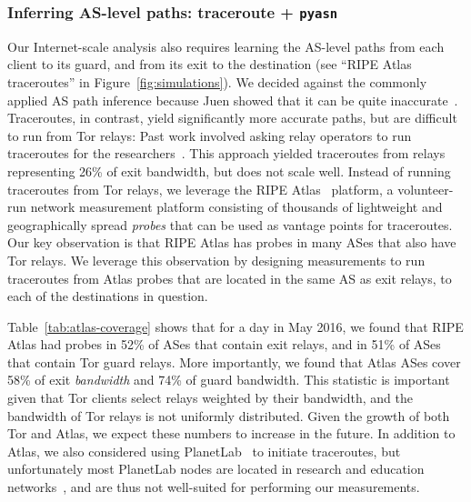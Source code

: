 \subsubsection{Inferring AS-level paths: traceroute + {\tt pyasn}}

Our Internet-scale analysis also requires learning the AS-level paths from each
client to its guard, and from its exit to the destination (see ``RIPE Atlas
traceroutes'' in Figure~\ref{fig:simulations}).  We decided against the commonly
applied AS path inference because Juen \ea showed that it can be quite
inaccurate~\cite{Juen2015a}.  Traceroutes, in contrast, yield significantly more
accurate paths, but are difficult to run from Tor relays:  Past work involved
asking relay operators to run traceroutes for the
researchers~\cite[\S~4]{Juen2015a}.  This approach yielded traceroutes from
relays representing 26\% of exit bandwidth, but does not scale well.  Instead of
running traceroutes from Tor relays, we leverage the RIPE Atlas~\cite{atlas}
platform, a volunteer-run network measurement platform consisting of thousands
of lightweight and geographically spread \emph{probes} that can be used as
vantage points for traceroutes.  Our key observation is that RIPE Atlas has
probes in many ASes that also have Tor relays.  We leverage this observation by
designing measurements to run traceroutes from Atlas probes that are located in
the same AS as exit relays, to each of the destinations in question.

Table~\ref{tab:atlas-coverage} shows that for a day in May 2016, we found that
RIPE Atlas had probes in 52\% of ASes that contain exit relays, and in 51\% of
ASes that contain Tor guard relays.  More importantly, we found that Atlas ASes
cover 58\% of exit \emph{bandwidth} and 74\% of guard bandwidth.  This statistic
is important given that Tor clients select relays weighted by their bandwidth,
and the bandwidth of Tor relays is not uniformly distributed.  Given the growth
of both Tor and Atlas, we expect these numbers to increase in the future.  In
addition to Atlas, we also considered using PlanetLab~\cite{planetlab} to
initiate traceroutes, but unfortunately most PlanetLab nodes are located in
research and education networks~\cite{Banerjee2004a}, and are thus not
well-suited for performing our measurements.

